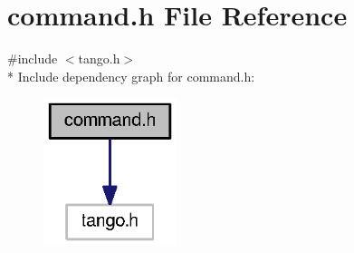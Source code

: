 \section{command.\-h File Reference}
\label{command_8h}
{\ttfamily \#include $<$tango.\-h$>$}\\*
Include dependency graph for command.\-h\-:
\nopagebreak
\begin{figure}[H]
\begin{center}
\leavevmode
\includegraphics[width=110pt]{d4/d4d/command_8h__incl}
\end{center}
\end{figure}
